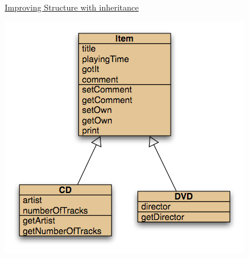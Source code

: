 \documentclass{article}[18pt]
\begin{document}
\begin{center}
\underline{\huge Improving Structure with inheritance}
\end{center}
\begin{center}
	\includegraphics[scale=0.7]{inherit}
\end{center}
\end{document}
